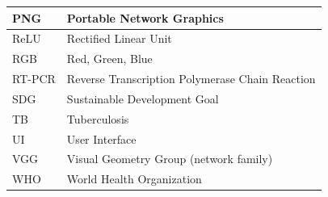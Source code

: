 \begin{center}
\begin{tabular}{|P{3.2cm}|P{10.5cm}|}
\hline
PNG & Portable Network Graphics \\
\hline
ReLU & Rectified Linear Unit \\
\hline
RGB & Red, Green, Blue \\
\hline
RT-PCR & Reverse Transcription Polymerase Chain Reaction \\
\hline
SDG & Sustainable Development Goal \\
\hline
TB & Tuberculosis \\
\hline
UI & User Interface \\
\hline
VGG & Visual Geometry Group (network family) \\
\hline
WHO & World Health Organization \\
\hline
\end{tabular}
\end{center}

\clearpage

\mainmatter
{}
\setcounter{page}{1}
